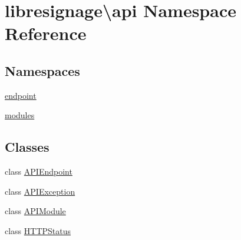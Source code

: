 \hypertarget{namespacelibresignage_1_1api}{}\section{libresignage\textbackslash{}api Namespace Reference}
\label{namespacelibresignage_1_1api}
\subsection*{Namespaces}
\begin{DoxyCompactItemize}
\item 
 \hyperlink{namespacelibresignage_1_1api_1_1endpoint}{endpoint}
\item 
 \hyperlink{namespacelibresignage_1_1api_1_1modules}{modules}
\end{DoxyCompactItemize}
\subsection*{Classes}
\begin{DoxyCompactItemize}
\item 
class \hyperlink{classlibresignage_1_1api_1_1APIEndpoint}{A\+P\+I\+Endpoint}
\item 
class \hyperlink{classlibresignage_1_1api_1_1APIException}{A\+P\+I\+Exception}
\item 
class \hyperlink{classlibresignage_1_1api_1_1APIModule}{A\+P\+I\+Module}
\item 
class \hyperlink{classlibresignage_1_1api_1_1HTTPStatus}{H\+T\+T\+P\+Status}
\end{DoxyCompactItemize}
